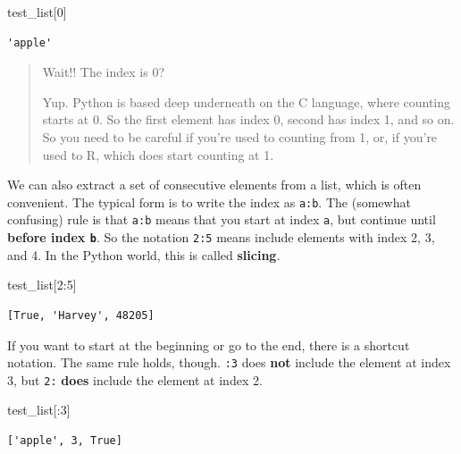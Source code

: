 \documentclass[
  letterpaper,
]{scrbook}
\newenvironment{Shaded}{\begin{snugshade}}{\end{snugshade}}
\newcommand{\DecValTok}[1]{\textcolor[rgb]{0.00,0.00,0.81}{#1}}
\newcommand{\NormalTok}[1]{#1}
\begin{document}
\begin{Shaded}
\begin{Highlighting}[]
\NormalTok{test_list[}\DecValTok{0}\NormalTok{]}
\end{Highlighting}
\end{Shaded}

\begin{verbatim}
'apple'
\end{verbatim}

\begin{quote}
Wait!! The index is 0?

Yup. Python is based deep underneath on the C language, where counting starts at 0. So the first element has index 0, second has index 1, and so on. So you need to be careful if you're used to counting from 1, or, if you're used to R, which does start counting at 1.
\end{quote}

We can also extract a set of consecutive elements from a list, which is often convenient. The typical form is to write the index as \texttt{a:b}. The (somewhat confusing) rule is that \texttt{a:b} means that you start at index \texttt{a}, but continue until \textbf{before index \texttt{b}}. So the notation \texttt{2:5} means include elements with index 2, 3, and 4. In the Python world, this is called \textbf{slicing}.

\begin{Shaded}
\begin{Highlighting}[]
\NormalTok{test_list[}\DecValTok{2}\NormalTok{:}\DecValTok{5}\NormalTok{]}
\end{Highlighting}
\end{Shaded}

\begin{verbatim}
[True, 'Harvey', 48205]
\end{verbatim}

If you want to start at the beginning or go to the end, there is a shortcut notation. The same rule holds, though. \texttt{:3} does \textbf{not} include the element at index 3, but \texttt{2:} \textbf{does} include the element at index 2.

\begin{Shaded}
\begin{Highlighting}[]
\NormalTok{test_list[:}\DecValTok{3}\NormalTok{]}
\end{Highlighting}
\end{Shaded}

\begin{verbatim}
['apple', 3, True]
\end{verbatim}
\end{document}
